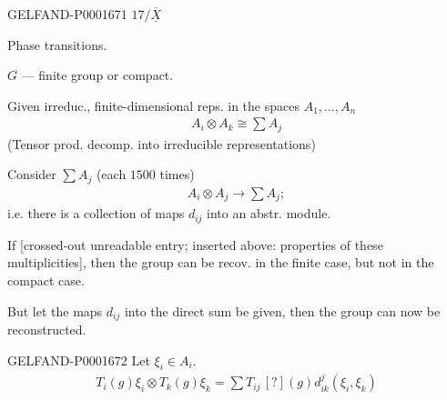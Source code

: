 \begin{GelfandAdjacentEvidence}{GELFAND-P000167}{1}
$17/\overline{\underline{X}}$ \quad {}\quad {}

Phase transitions.

\hfill{}


\quad {}

$G$ — finite group or compact.


Given irreduc., finite-dimensional reps. in the spaces $A_1,\ldots, A_n$
\begin{gather*}
A_i\otimes A_k\cong\sum A_j
\end{gather*}
(Tensor prod. decomp. into irreducible representations)


Consider $\sum A_j$ (each $1500$ times)
\begin{gather*}
A_i\otimes A_j\longrightarrow\sum A_j;
\end{gather*}
i.e. there is a collection of maps $d_{ij}$ into an abstr. module.


If [crossed-out unreadable entry; inserted above: properties of these multiplicities], then the group can be recov. in the finite case, but not in the compact case.
\end{GelfandAdjacentEvidence}


But let the maps $d_{ij}$ into the direct sum be given, then the group can now be reconstructed.

\begin{GelfandAdjacentEvidence}{GELFAND-P000167}{2}
Let $\xi_i\in A_i$.
\begin{gather*}
T_i (g)\xi_i\otimes T_k (g)\xi_k
=\sum T_{ij}\, [?](g)d^j_{ik}(\xi_i,\xi_k)
\end{gather*}
\end{GelfandAdjacentEvidence}


